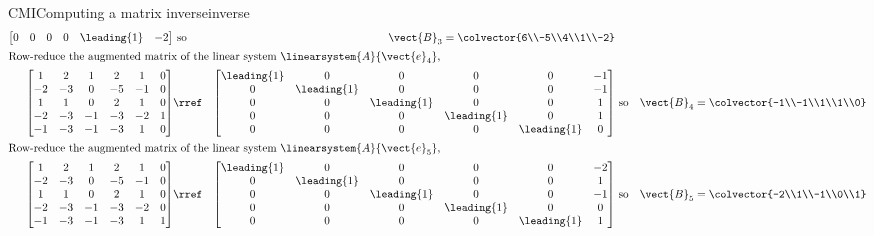\begin{example}{CMI}{Computing a matrix inverse}{inverse}
\begin{align*}
\begin{bmatrix}
0 & 0 & 0 & 0 & \leading{1} & -2
\end{bmatrix}
%
&\text{ so}&
%
\vect{B}_3=\colvector{6\\-5\\4\\1\\-2}\\
%
\intertext{Row-reduce the augmented matrix of the linear system $\linearsystem{A}{\vect{e}_4}$,}
\begin{bmatrix}
 1 & 2 & 1 & 2 & 1 & 0\\
 -2 & -3 & 0 & -5 & -1 & 0\\
 1 & 1 & 0 & 2 & 1 & 0\\
 -2 & -3 & -1 & -3 & -2 & 1\\
 -1 & -3 & -1 & -3 & 1 & 0
\end{bmatrix}
%
&\rref&
%
\begin{bmatrix}
\leading{1} & 0 & 0 & 0 & 0 & -1\\
0 & \leading{1} & 0 & 0 & 0 & -1\\
0 & 0 & \leading{1} & 0 & 0 & 1\\
0 & 0 & 0 & \leading{1} & 0 & 1\\
0 & 0 & 0 & 0 & \leading{1} & 0
\end{bmatrix}
%
&\text{ so}&
%
\vect{B}_4=\colvector{-1\\-1\\1\\1\\0}\\
%
\intertext{Row-reduce the augmented matrix of the linear system $\linearsystem{A}{\vect{e}_5}$,}
\begin{bmatrix}
 1 & 2 & 1 & 2 & 1 & 0\\
 -2 & -3 & 0 & -5 & -1 & 0\\
 1 & 1 & 0 & 2 & 1 & 0\\
 -2 & -3 & -1 & -3 & -2 & 0\\
 -1 & -3 & -1 & -3 & 1 & 1
\end{bmatrix}
%
&\rref&
%
\begin{bmatrix}
\leading{1} & 0 & 0 & 0 & 0 & -2\\
0 & \leading{1} & 0 & 0 & 0 & 1\\
0 & 0 & \leading{1} & 0 & 0 & -1\\
0 & 0 & 0 & \leading{1} & 0 & 0\\
0 & 0 & 0 & 0 & \leading{1} & 1
\end{bmatrix}
%
&\text{ so}&
%
\vect{B}_5=\colvector{-2\\1\\-1\\0\\1}\\

\end{align*}
\end{example}
